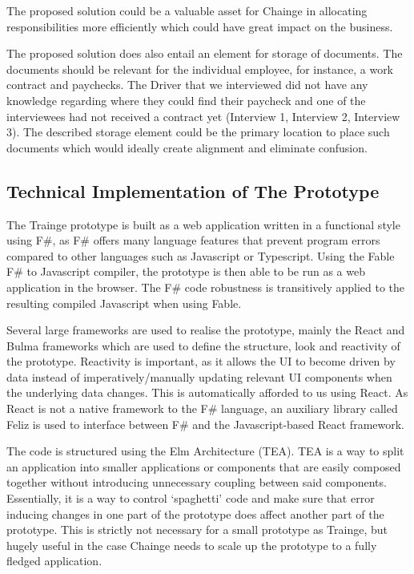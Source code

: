 The proposed solution could be a valuable asset for Chainge in
allocating responsibilities more efficiently which could have great
impact on the business.

The proposed solution does also entail an element for storage of
documents. The documents should be relevant for the individual employee,
for instance, a work contract and paychecks. The Driver that we
interviewed did not have any knowledge regarding where they could find
their paycheck and one of the interviewees had not received a contract
yet (Interview 1, Interview 2, Interview 3). The described storage
element could be the primary location to place such documents which
would ideally create alignment and eliminate confusion.

\hypertarget{sec:technical_impl}{%
\subsection{Technical Implementation of The
Prototype}\label{sec:technical_impl}}

The Trainge prototype is built as a web application written in a
functional style using F\#, as F\# offers many language features that
prevent program errors compared to other languages such as Javascript or
Typescript. Using the Fable F\# to Javascript compiler, the prototype is
then able to be run as a web application in the browser. The F\# code
robustness is transitively applied to the resulting compiled Javascript
when using Fable.

Several large frameworks are used to realise the prototype, mainly the
React and Bulma frameworks which are used to define the structure, look
and reactivity of the prototype. Reactivity is important, as it allows
the UI to become driven by data instead of imperatively/manually
updating relevant UI components when the underlying data changes. This
is automatically afforded to us using React. As React is not a native
framework to the F\# language, an auxiliary library called Feliz is used
to interface between F\# and the Javascript-based React framework.

The code is structured using the Elm Architecture (TEA). TEA is a way to
split an application into smaller applications or components that are
easily composed together without introducing unnecessary coupling
between said components. Essentially, it is a way to control `spaghetti'
code and make sure that error inducing changes in one part of the
prototype does affect another part of the prototype. This is strictly
not necessary for a small prototype as Trainge, but hugely useful in the
case Chainge needs to scale up the prototype to a fully fledged
application.

